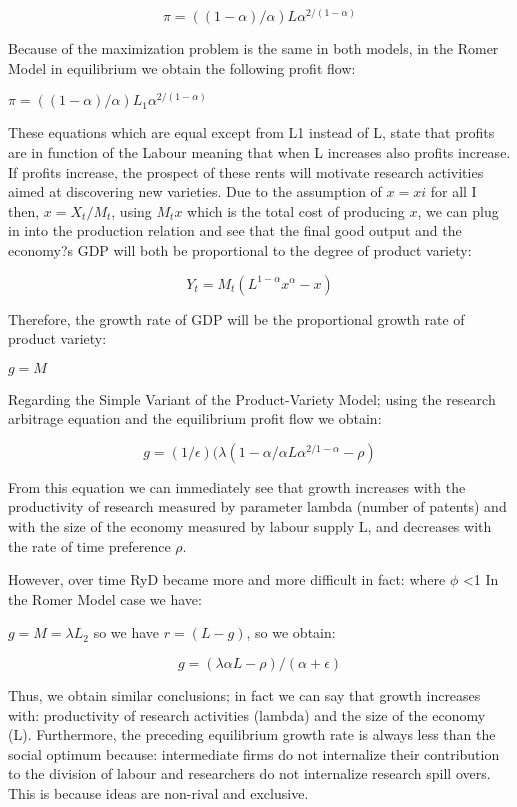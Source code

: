 \documentclass{article}
\begin{document}
\begin{equation} 
\pi= ((1-\alpha)/\alpha) L\alpha^{2/(1-\alpha)}
\end{equation}

Because of the maximization problem is the same in both models, in the Romer Model in equilibrium we obtain the following profit flow:
 
$\pi =((1-\alpha)/\alpha) L_{1}\alpha^{2/(1-\alpha)}$ 
 
These equations which are equal except from L1 instead of L, state that profits are in function of the Labour meaning that when L increases also profits increase.
If profits increase, the prospect of these rents will motivate research activities aimed at discovering new varieties.
Due to the assumption of $x=xi$  for all I then, $x=X_{t}/M_{t}$, using $M_{t}x$ which is the total cost of producing $x$, we can plug in into the production relation and see that the final good output and the economy?s GDP will both be proportional to the degree of product variety:
 
\begin{equation} 
Y_{t} = M_{t}(L^{1-\alpha}x^{\alpha}-x)
\end{equation}
 
Therefore, the growth rate of GDP will be the proportional growth rate of product variety:
 
 $g=M$ 
 
 Regarding the Simple Variant of the Product-Variety Model; using the research arbitrage equation and the equilibrium profit flow we obtain:
 
\begin{equation} 
g=(1/\epsilon) (\lambda (1-\alpha/\alpha L\alpha^{2/1-\alpha}-\rho)
\end{equation}

From this equation we can immediately see that growth increases with the productivity of research measured by parameter lambda (number of patents) and with the size of the economy measured by labour supply L, and decreases with the rate of time preference $\rho$.

 However, over time RyD became more and more difficult in fact:
		     where $\phi$ <1
In the Romer Model case we have:

 $g = M = \lambda L_{2}$	so we have $r=(L-g)$, so we obtain:

\begin{equation}
g = (\lambda\alpha L-\rho)/(\alpha+\epsilon)
\end{equation}

Thus, we obtain similar conclusions; in fact we can say that growth increases with: productivity of research activities (lambda) and the size of the economy (L). Furthermore, the preceding equilibrium growth rate is always less than the social optimum because: intermediate firms do not internalize their contribution to the division of labour and researchers do not internalize research spill overs. This is because ideas are non-rival and exclusive.
\end{document}
